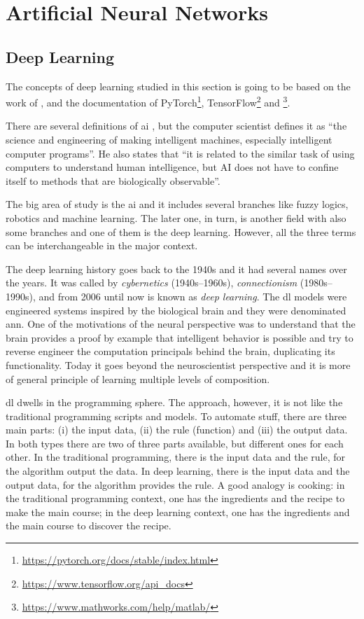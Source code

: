 \section{Artificial Neural Networks}\label{sec:ann}

\subsection{Deep Learning}\label{sec:deep_learning}

The concepts of deep learning studied in this section is going to be based on the work of \citet{goodfellow2016}, \citet{haykin1999} and the documentation of PyTorch\footnote{\url{https://pytorch.org/docs/stable/index.html}}, TensorFlow\footnote{\url{https://www.tensorflow.org/api_docs}} and \matlab\footnote{\url{https://www.mathworks.com/help/matlab/}}.

There are several definitions of \gls*{ai} \citep{winston1992}, but the  computer scientist \citet{mccarthy2007} defines it as ``the science and engineering of making intelligent machines, especially intelligent computer programs''.
He also states that ``it is related to the similar task of using computers to understand human intelligence, but AI does not have to confine itself to methods that are biologically observable''.

The big area of study is the \gls*{ai} and it includes several branches like fuzzy logics, robotics and machine learning.
The later one, in turn, is another field with also some branches and one of them is the deep learning.
However, all the three terms can be interchangeable in the major context.

The deep learning history goes back to the 1940s and it had several names over the years. 
It was called by \emph{cybernetics} (1940s--1960s), \emph{connectionism} (1980s--1990s), and from 2006 until now is known as \emph{deep learning}.
The \gls*{dl} models were engineered systems inspired by the biological brain and they were denominated \gls*{ann}.
One of the motivations of the neural  perspective was to understand that the brain provides a proof by example that intelligent behavior is possible and try to reverse engineer the computation principals behind the brain, duplicating its functionality.
Today it goes beyond the neuroscientist perspective and it is more of general principle of learning multiple levels of composition.

\gls*{dl} dwells in the programming sphere. The approach, however, it is not like the traditional programming scripts and models. To automate stuff, there are three main parts: (i) the input data, (ii) the rule (function) and (iii) the output data. In both types there are two of three parts available, but different ones for each other. In the traditional programming, there is the input data and the rule, for the algorithm output the data. In deep learning, there is the input data and the output data, for the algorithm provides the rule. A good analogy is cooking: in the traditional programming context, one has the ingredients and the recipe to make the main course; in the deep learning context, one has the ingredients and the main course to discover the recipe.

